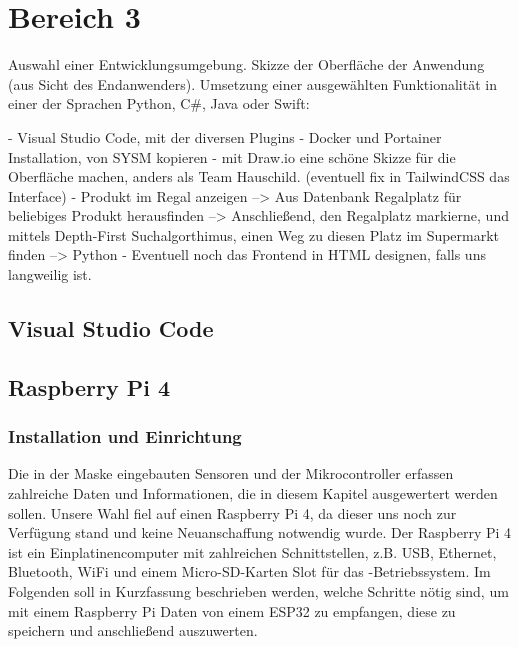 \section{Bereich 3}
Auswahl einer Entwicklungsumgebung.
Skizze der Oberfläche der Anwendung (aus Sicht des Endanwenders).
Umsetzung einer ausgewählten Funktionalität in einer der Sprachen Python, C\#, Java oder Swift:

- Visual Studio Code, mit der diversen Plugins
- Docker und Portainer Installation, von SYSM kopieren
- mit Draw.io eine schöne Skizze für die Oberfläche machen, anders als Team Hauschild. (eventuell fix in TailwindCSS das Interface)
- Produkt im Regal anzeigen --> Aus Datenbank Regalplatz für beliebiges Produkt herausfinden --> Anschließend, den Regalplatz markierne, und mittels Depth-First Suchalgorthimus, einen Weg zu diesen Platz im Supermarkt finden --> Python
- Eventuell noch das Frontend in HTML designen, falls uns langweilig ist.


\subsection{Visual Studio Code}

\subsection{Raspberry Pi 4}
\label{sec:raspi}
\subsubsection{Installation und Einrichtung}
Die in der Maske eingebauten Sensoren und der Mikrocontroller erfassen zahlreiche Daten und Informationen, die in diesem Kapitel ausgewertert werden sollen.
Unsere Wahl fiel auf einen Raspberry Pi 4, da dieser uns noch zur Verfügung stand und keine Neuanschaffung notwendig wurde.
Der Raspberry Pi 4 ist ein Einplatinencomputer mit zahlreichen Schnittstellen, z.B. USB, Ethernet, Bluetooth, WiFi und einem Micro-SD-Karten Slot für das -Betriebssystem.
Im Folgenden soll in Kurzfassung beschrieben werden, welche Schritte nötig sind, um mit einem Raspberry Pi Daten von einem ESP32 zu empfangen, diese zu speichern und anschließend auszuwerten.

